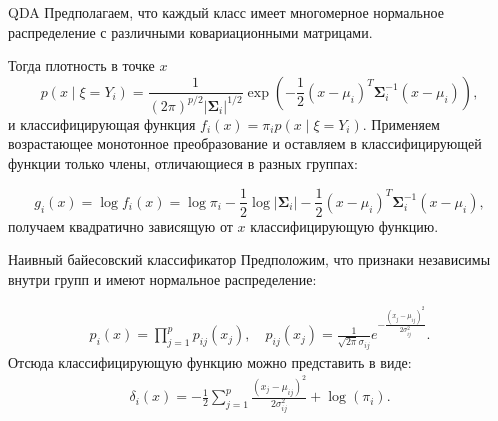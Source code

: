 \documentclass[11pt]{beamer}
\begin{document}
\begin{frame}{QDA}
	Предполагаем, что каждый класс имеет многомерное нормальное распределение с различными ковариационными матрицами.
	
	\pause
	
	Тогда плотность в точке $x$
	$$p\left(x\middle\vert \xi = Y_i\right) = \frac{1}{\left(2\pi\right)^{p/2}\left\vert\bm{\Sigma}_i\right\vert^{1/2}} \exp\left(-\frac{1}{2}{\left(x -\mu_i\right)^T}\bm{\Sigma}_i^{-1}\left(x -\mu_i\right)\right),$$
	и классифицирующая функция $f_i\left(x\right) = \pi_i p\left(x\middle\vert \xi = Y_i\right)$. Применяем возрастающее монотонное преобразование и оставляем в классифицирующей функции только члены, отличающиеся в разных группах:
	
	$$g_i\left(x\right) = \log f_i\left(x\right) = \log \pi_i - \frac{1}{2}\log\left\vert\bm{\Sigma}_i\right\vert -  \frac{1}{2}{\left(x -\mu_i\right)^T}\bm{\Sigma}_i^{-1}\left(x -\mu_i\right),$$
	получаем квадратично зависящую от $x$ классифицирующую функцию.
\end{frame}

\begin{frame}{Наивный байесовский классификатор}
	Предположим, что признаки независимы внутри групп и имеют нормальное распределение:
	
	\pause
	
	\begin{align*}
		p_i(x) = \prod_{j = 1}^p p_{ij}(x_j), \quad p_{ij}(x_j) = \frac{1}{\sqrt{2\pi}\sigma_{ij}}e^{-\frac{(x_j -\mu_{ij})^2}{2\sigma^2_{ij}}}.
	\end{align*}
	Отсюда классифицирующую функцию можно представить в виде:
	\begin{align*}
		\delta_i(x) = -\frac{1}{2}\sum_{j = 1}^p\frac{(x_j -\mu_{ij})^2}{2\sigma^2_{ij}} + \log(\pi_i).
	\end{align*}
\end{frame}
\end{document}
